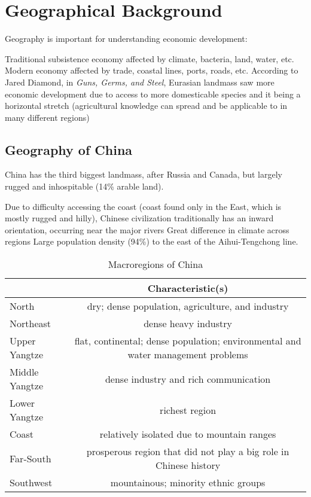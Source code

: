 \documentclass[11pt]{article}
\theoremstyle{definition}
\theoremstyle{remark}
\begin{document}
\section{Geographical Background}
Geography is important for understanding economic development:
\begin{outline}[enumerate]
\1 Traditional subsistence economy affected by climate, bacteria, land, water, etc.
\1 Modern economy affected by trade, coastal lines, ports, roads, etc.
\1 According to Jared Diamond, in \textit{Guns, Germs, and Steel}, Eurasian landmass saw more economic development due to access to more domesticable species and it being a horizontal stretch (agricultural knowledge can spread and be applicable to in many different regions)  
\end{outline}

\subsection{Geography of China}
China has the third biggest landmass, after Russia and Canada, but largely rugged and inhospitable (14\% arable land). 
\begin{outline}[enumerate]
\1 Due to difficulty accessing the coast (coast found only in the East, which is mostly rugged and hilly), Chinese civilization traditionally has an inward orientation, occurring near the major rivers
\1 Great difference in climate across regions
\1 Large population density (94\%) to the east of the Aihui-Tengchong line.
\end{outline}

\begin{table}[ht]
\caption{Macroregions of China}
\begin{adjustbox}{width={\textwidth},center}
\begin{tabular}{lc}
\toprule
&Characteristic(s)\\
\midrule
North & dry; dense population, agriculture, and industry\\
Northeast& dense heavy industry\\
Upper Yangtze & flat, continental; dense population; environmental and water management problems\\
Middle Yangtze & dense industry and rich communication\\
Lower Yangtze & richest region\\
Coast& relatively isolated due to mountain ranges\\
Far-South & prosperous region that did not play a big role in Chinese history\\
Southwest & mountainous; minority ethnic groups\\
\bottomrule
\end{tabular}
\end{adjustbox}
\end{table}
\end{document}
